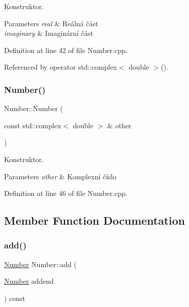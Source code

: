 Konstruktor. 


\begin{DoxyParams}{Parameters}
{\em real} & Reálná část \\
\hline
{\em imaginary} & Imaginární část \\
\hline
\end{DoxyParams}


Definition at line 42 of file Number.\+cpp.



Referenced by operator std\+::complex$<$ double $>$().

\mbox{\label{classteam22_1_1_math_1_1_number_a68e43ad66c5152bf7f39277bba1c0f1c}} 
\subsubsection{\texorpdfstring{Number()}{Number()}\hspace{0.1cm}{\footnotesize\ttfamily [2/2]}}
{\footnotesize\ttfamily Number\+::\+Number (\begin{DoxyParamCaption}\item[{const std\+::complex$<$ double $>$ \&}]{other }\end{DoxyParamCaption})}



Konstruktor. 


\begin{DoxyParams}{Parameters}
{\em other} & Komplexní číslo \\
\hline
\end{DoxyParams}


Definition at line 46 of file Number.\+cpp.



\subsection{Member Function Documentation}
\mbox{\label{classteam22_1_1_math_1_1_number_ae60b13b53c984dce975d1519e199ef8a}} 
\subsubsection{\texorpdfstring{add()}{add()}}
{\footnotesize\ttfamily \hyperlink{classteam22_1_1_math_1_1_number}{Number} Number\+::add (\begin{DoxyParamCaption}\item[{\hyperlink{classteam22_1_1_math_1_1_number}{Number}}]{addend }\end{DoxyParamCaption}) const}



